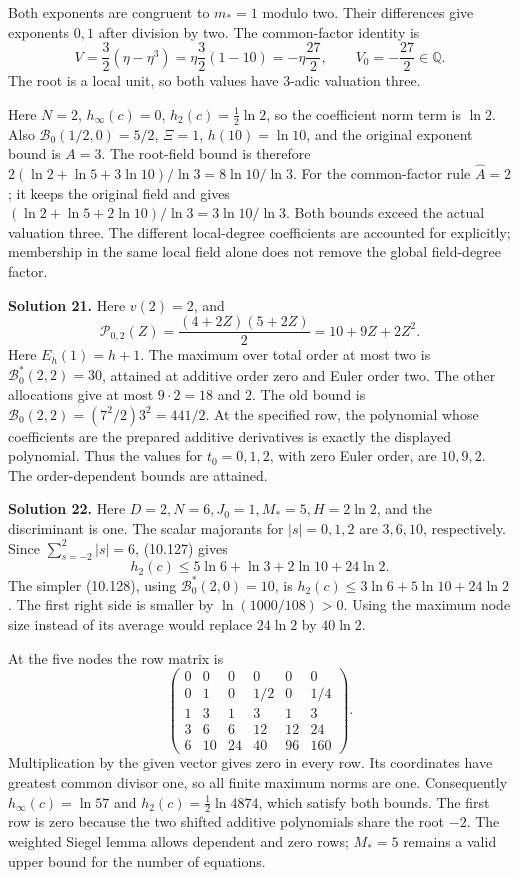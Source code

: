 \documentclass[
  11pt,
  a4paper,
]{article}
\begin{document}
Both exponents are congruent to \(m_*=1\) modulo two. Their differences
give exponents \(0,1\) after division by two. The common-factor identity
is \[
V=\frac32(\eta-\eta^3)
=\eta\frac32(1-10)=-\eta\frac{27}{2},
\qquad V_0=-\frac{27}{2}\in\mathbb Q.
\] The root is a local unit, so both values have 3-adic valuation three.

Here \(N=2\), \(h_\infty(c)=0\), \(h_2(c)=\tfrac12\ln2\), so the
coefficient norm term is \(\ln2\). Also \(\mathcal B_0(1/2,0)=5/2\),
\(\Xi=1\), \(h(10)=\ln10\), and the original exponent bound is \(A=3\).
The root-field bound is therefore
\(2(\ln2+\ln5+3\ln10)/\ln3=8\ln10/\ln3\). For the common-factor rule
\(\widehat A=2\); it keeps the original field and gives
\((\ln2+\ln5+2\ln10)/\ln3=3\ln10/\ln3\). Both bounds exceed the actual
valuation three. The different local-degree coefficients are accounted
for explicitly; membership in the same local field alone does not remove
the global field-degree factor.

\textbf{Solution 21.} Here \(v(2)=2\), and \[
\mathcal P_{0,2}(Z)=\frac{(4+2Z)(5+2Z)}2=10+9Z+2Z^2.
\] Here \(E_h(1)=h+1\). The maximum over total order at most two is
\(\mathcal B_0^*(2,2)=30\), attained at additive order zero and Euler
order two. The other allocations give at most \(9\cdot2=18\) and \(2\).
The old bound is \(\mathcal B_0(2,2)=(7^2/2)3^2=441/2\). At the
specified row, the polynomial whose coefficients are the prepared
additive derivatives is exactly the displayed polynomial. Thus the
values for \(t_0=0,1,2\), with zero Euler order, are \(10,9,2\). The
order-dependent bounds are attained.

\textbf{Solution 22.} Here \(D=2,N=6,J_0=1,M_*=5,H=2\ln2\), and the
discriminant is one. The scalar majorants for \(|s|=0,1,2\) are
\(3,6,10\), respectively. Since \(\sum_{s=-2}^2|s|=6\), (10.127) gives
\[
h_2(c)\le5\ln6+\ln3+2\ln10+24\ln2.
\] The simpler (10.128), using \(\mathcal B_0^*(2,0)=10\), is
\(h_2(c)\le3\ln6+5\ln10+24\ln2\). The first right side is smaller by
\(\ln(1000/108)>0\). Using the maximum node size instead of its average
would replace \(24\ln2\) by \(40\ln2\).

At the five nodes the row matrix is \[
\begin{pmatrix}
0&0&0&0&0&0\\
0&1&0&1/2&0&1/4\\
1&3&1&3&1&3\\
3&6&6&12&12&24\\
6&10&24&40&96&160
\end{pmatrix}.
\] Multiplication by the given vector gives zero in every row. Its
coordinates have greatest common divisor one, so all finite maximum
norms are one. Consequently \(h_\infty(c)=\ln57\) and
\(h_2(c)=\tfrac12\ln4874\), which satisfy both bounds. The first row is
zero because the two shifted additive polynomials share the root \(-2\).
The weighted Siegel lemma allows dependent and zero rows; \(M_*=5\)
remains a valid upper bound for the number of equations.
\end{document}

